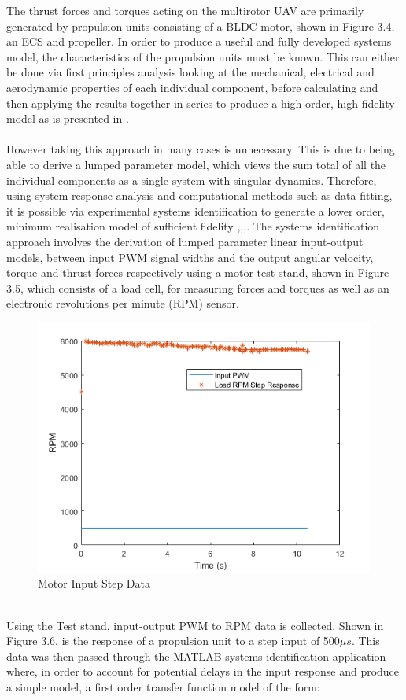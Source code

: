 \documentclass[12pt,a4paper,twoside]{report}
\begin{document}
			The thrust forces and torques acting on the multirotor UAV are primarily generated by propulsion units consisting of a BLDC motor, shown in Figure 3.4, an ECS and propeller. In order to produce a useful and fully developed systems model, the characteristics of the propulsion units must be known. This can either be done via first principles analysis looking at the mechanical, electrical and aerodynamic properties of each individual component, before calculating and then applying the results together in series to produce a high order, high fidelity model as is presented in \cite{17}. 
			\\ \\
			However taking this approach in many cases is unnecessary. This is due to being able to derive a lumped parameter model, which views the sum total of all the individual components as a single system with singular dynamics. Therefore, using system response analysis and computational methods such as data fitting, it is possible via experimental systems identification to generate a lower order, minimum realisation model of sufficient fidelity \cite{9},\cite{12},\cite{15},\cite{16}. The systems identification approach involves the derivation of lumped parameter linear input-output models, between input PWM signal widths and the output angular velocity, torque and thrust forces respectively using a motor test stand, shown in Figure 3.5, which consists of a load cell, for measuring forces and torques as well as an electronic revolutions per minute (RPM) sensor.
			\\
			\begin{figure}[h!]
				\centering
				\includegraphics[width=0.7\linewidth]{InputStepData.png}
				\caption{Motor Input Step Data}
				\label{fig:inputstepdata}
			\end{figure}
			\\
			Using the Test stand, input-output PWM to RPM data is collected. Shown in Figure 3.6, is the response of a propulsion unit to a step input of 500$\mu s$. This data was then passed through the MATLAB systems identification application where, in order to account for potential delays in the input response and produce a simple model, a first order transfer function model of the form:
\end{document}
